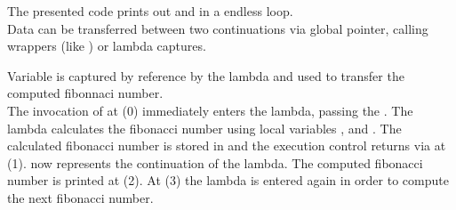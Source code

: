 The presented code prints out  and  in a endless loop.\\

Data can be transferred between two continuations via global pointer, calling
wrappers (like ) or lambda captures.

Variable  is captured by reference by the lambda and used to transfer
the computed fibonnaci number.\\
The invocation of \callcc at (0) immediately enters the lambda, passing the
\currcont. The lambda calculates the fibonacci number using local variables
,  and . The calculated fibonacci number is stored in
 and the execution control returns via \resume at (1).
 now represents the continuation of the lambda. The computed fibonacci
number is printed at (2). At (3) the lambda is entered again in order to compute
the next fibonacci number.
